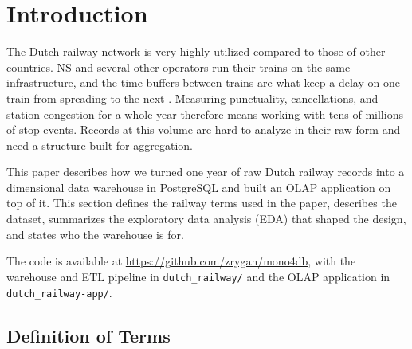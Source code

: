 \section{Introduction}
\label{sec:introduction}

The Dutch railway network is very highly utilized compared to those of other countries. NS and several other operators run their trains on the same infrastructure, and the time buffers between trains are what keep a delay on one train from spreading to the next \cite{kroon2008dutch}. Measuring punctuality, cancellations, and station congestion for a whole year therefore means working with tens of millions of stop events. Records at this volume are hard to analyze in their raw form and need a structure built for aggregation.

This paper describes how we turned one year of raw Dutch railway records into a dimensional data warehouse in PostgreSQL and built an OLAP application on top of it. This section defines the railway terms used in the paper, describes the dataset, summarizes the exploratory data analysis (EDA) that shaped the design, and states who the warehouse is for.

The code is available at \url{https://github.com/zrygan/mono4db}, with the warehouse and ETL pipeline in \texttt{dutch\_railway/} and the OLAP application in \texttt{dutch\_railway-app/}.

\subsection{Definition of Terms}
\label{subsec:definitions}

